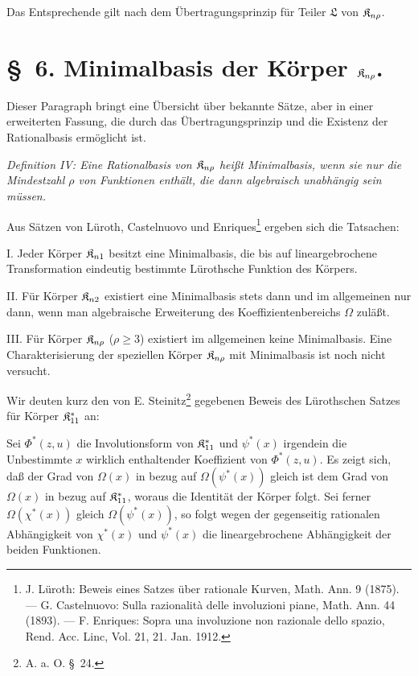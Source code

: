 Das Entsprechende gilt nach dem Übertragungsprinzip für Teiler $\mathfrak{L}$ von $\mathfrak{K}_{n\rho}$.

\section*{\S\ 6. Minimalbasis der Körper $\mathfrak{K}_{n\rho}$.}

Dieser Paragraph bringt eine Übersicht über bekannte Sätze, aber in einer erweiterten Fassung, die durch das Übertragungsprinzip und die Existenz der Rationalbasis ermöglicht ist.

\emph{Definition IV: Eine Rationalbasis von $\mathfrak{K}_{n\rho}$ heißt Minimalbasis, wenn sie nur die Mindestzahl $\rho$ von Funktionen enthält, die dann algebraisch unabhängig sein müssen.}

Aus Sätzen von Lüroth, Castelnuovo und Enriques\footnote{J. Lüroth: Beweis eines Satzes über rationale Kurven, Math. Ann. 9 (1875). --- G. Castelnuovo: Sulla razionalità delle involuzioni piane, Math. Ann. 44 (1893). --- F. Enriques: Sopra una involuzione non razionale dello spazio, Rend. Acc. Linc, Vol. 21, 21. Jan. 1912.} ergeben sich die Tatsachen:

I. Jeder Körper $\mathfrak{K}_{n1}$ besitzt eine Minimalbasis, die bis auf lineargebrochene Transformation eindeutig bestimmte Lürothsche Funktion des Körpers.

II. Für Körper $\mathfrak{K}_{n2}$ existiert eine Minimalbasis stets dann und im allgemeinen nur dann, wenn man algebraische Erweiterung des Koeffizientenbereichs $\Omega$ zuläßt.

III. Für Körper $\mathfrak{K}_{n\rho}$ ($\rho\ge3$) existiert im allgemeinen keine Minimalbasis. Eine Charakterisierung der speziellen Körper $\mathfrak{K}_{n\rho}$ mit Minimalbasis ist noch nicht versucht.

Wir deuten kurz den von E. Steinitz\footnote{A. a. O. \S\ 24.} gegebenen Beweis des Lürothschen Satzes für Körper $\mathfrak{K}^*_{11}$ an:

Sei $\Phi^*(z,u)$ die Involutionsform von $\mathfrak{K}^*_{11}$ und $\psi^*(x)$ irgendein die Unbestimmte $x$ wirklich enthaltender Koeffizient von $\Phi^*(z,u)$. Es zeigt sich, daß der Grad von $\Omega(x)$ in bezug auf $\Omega(\psi^*(x))$ gleich ist dem Grad von $\Omega(x)$ in bezug auf $\mathfrak{K}^*_{11}$, woraus die Identität der Körper folgt. Sei ferner $\Omega(\chi^*(x))$ gleich $\Omega(\psi^*(x))$, so folgt wegen der gegenseitig rationalen Abhängigkeit von $\chi^*(x)$ und $\psi^*(x)$ die lineargebrochene Abhängigkeit der beiden Funktionen.

